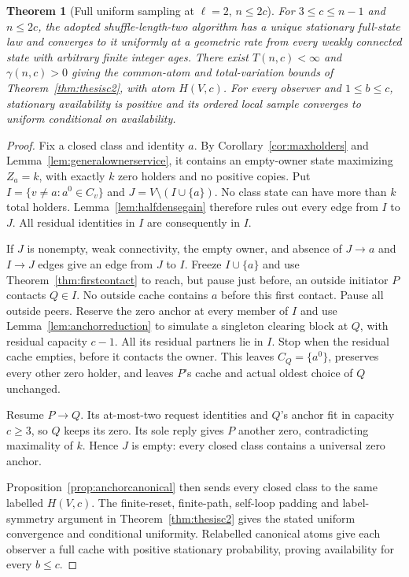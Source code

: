\documentclass[11pt]{article}
\newtheorem{theorem}{Theorem}
\begin{document}
\begin{theorem}[Full uniform sampling at $\ell=2$, $n\le2c$]
\label{thm:thesishalfdense}
For $3\le c\le n-1$ and $n\le2c$, the adopted
shuffle-length-two algorithm has a unique stationary
full-state law and converges to it uniformly at a
geometric rate from every weakly connected state with
arbitrary finite integer ages. There exist
$T(n,c)<\infty$ and $\gamma(n,c)>0$ giving the
common-atom and total-variation bounds of
Theorem~\ref{thm:thesisc2}, with atom $H(V,c)$.
For every observer and $1\le b\le c$, stationary
availability is positive and its ordered local sample
converges to uniform conditional on availability.
\end{theorem}
\begin{proof}
Fix a closed class and identity $a$. By
Corollary~\ref{cor:maxholders} and
Lemma~\ref{lem:generalownerservice}, it contains an
empty-owner state maximizing $Z_a=k$, with exactly $k$
zero holders and no positive copies. Put
$I=\{v\ne a:a^0\in C_v\}$ and
$J=V\setminus(I\cup\{a\})$. No class state can have
more than $k$ total holders. Lemma~\ref{lem:halfdensegain}
therefore rules out every edge from $I$ to $J$.
All residual identities in $I$ are consequently in $I$.

If $J$ is nonempty, weak connectivity, the empty owner,
and absence of $J\to a$ and $I\to J$ edges give an
edge from $J$ to $I$. Freeze $I\cup\{a\}$ and use
Theorem~\ref{thm:firstcontact} to reach, but pause just
before, an outside initiator $P$ contacts $Q\in I$.
No outside cache contains $a$ before this first contact.
Pause all outside peers. Reserve the zero anchor at
every member of $I$ and use
Lemma~\ref{lem:anchorreduction} to simulate a
singleton clearing block at $Q$, with residual capacity
$c-1$. All its residual partners lie in $I$.
Stop when the residual cache empties, before it contacts
the owner. This leaves $C_Q=\{a^0\}$, preserves every
other zero holder, and leaves $P$'s cache and actual
oldest choice of $Q$ unchanged.

Resume $P\to Q$. Its at-most-two request identities
and $Q$'s anchor fit in capacity $c\ge3$, so $Q$
keeps its zero. Its sole reply gives $P$ another zero,
contradicting maximality of $k$. Hence $J$ is empty:
every closed class contains a universal zero anchor.

Proposition~\ref{prop:anchorcanonical} then sends every
closed class to the same labelled $H(V,c)$.
The finite-reset, finite-path, self-loop padding and
label-symmetry argument in Theorem~\ref{thm:thesisc2}
gives the stated uniform convergence and conditional
uniformity. Relabelled canonical atoms give each
observer a full cache with positive stationary
probability, proving availability for every $b\le c$.
\end{proof}
\end{document}
